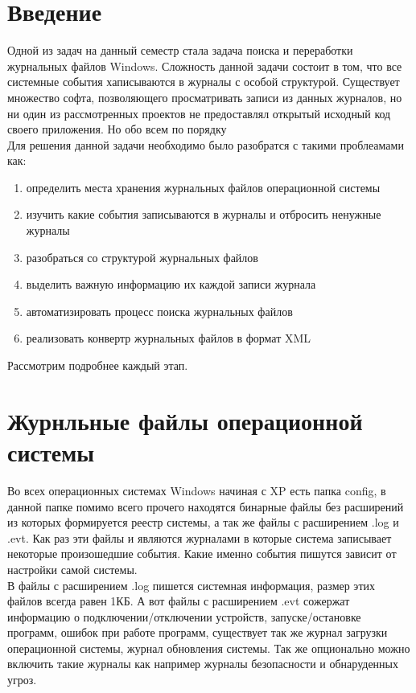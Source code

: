 \newpage

\chapter*{Введение}

Одной из задач на данный семестр стала задача поиска и переработки журнальных файлов Windows. Сложность данной задачи состоит в том, что все системные события хаписываются в журналы с особой структурой. Существует множество софта, позволяющего просматривать записи из данных журналов, но ни один из рассмотренных проектов не предоставлял открытый исходный код своего приложения. Но обо всем по порядку \\
Для решения данной задачи необходимо было разобратся с такими проблеамами как: \\

\begin{enumerate}
\item определить места хранения журнальных файлов операционной системы
\item изучить какие события записываются в журналы и отбросить ненужные журналы
\item разобраться со структурой журнальных файлов
\item выделить важную информацию их каждой записи журнала
\item автоматизировать процесс поиска журнальных файлов
\item реализовать конвертр журнальных файлов в формат XML
\end{enumerate}

Рассмотрим подробнее каждый этап. \\

\chapter*{Журнльные файлы операционной системы }

Во всех операционных системах Windows начиная с XP есть папка config, в данной папке помимо всего прочего находятся бинарные файлы без расширений из которых формируется реестр системы, а так же файлы с расширением .log и .evt. Как раз эти файлы и являются журналами в которые система записывает некоторые произошедшие события. Какие именно события пишутся зависит от настройки самой системы. \\

В файлы с расширением .log пишется системная информация, размер этих файлов всегда равен 1КБ. А вот файлы с расширением .evt сожержат информацию о подключении/отключении устройств, запуске/остановке программ, ошибок при работе программ, существует так же журнал загрузки операционной системы, журнал обновления системы. Так же опционально можно включить такие журналы как например журналы безопасности и обнаруденных угроз. \\

